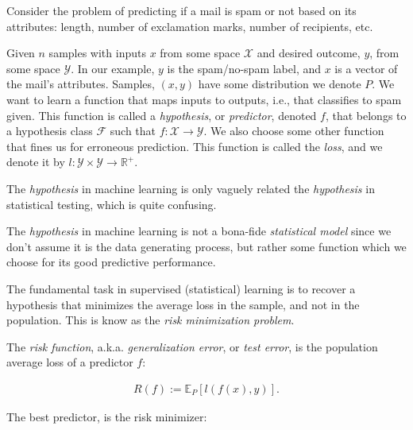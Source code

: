 \documentclass[]{book}
\theoremstyle{definition}
\theoremstyle{definition}
\theoremstyle{definition}
\theoremstyle{remark}
\let\BeginKnitrBlock\begin \let\EndKnitrBlock\end
\begin{document}
\BeginKnitrBlock{example}[Rental Prices]
\protect\hypertarget{exm:rental-prices}{}{\label{exm:rental-prices}
{} }Consider the problem of predicting if a
mail is spam or not based on its attributes: length, number of
exclamation marks, number of recipients, etc.
\EndKnitrBlock{example}

Given \(n\) samples with inputs \(x\) from some space \(\mathcal{X}\)
and desired outcome, \(y\), from some space \(\mathcal{Y}\). In our
example, \(y\) is the spam/no-spam label, and \(x\) is a vector of the
mail's attributes. Samples, \((x,y)\) have some distribution we denote
\(P\). We want to learn a function that maps inputs to outputs, i.e.,
that classifies to spam given. This function is called a
\emph{hypothesis}, or \emph{predictor}, denoted \(f\), that belongs to a
hypothesis class \(\mathcal{F}\) such that
\(f:\mathcal{X} \to \mathcal{Y}\). We also choose some other function
that fines us for erroneous prediction. This function is called the
\emph{loss}, and we denote it by
\(l:\mathcal{Y}\times \mathcal{Y} \to \mathbb{R}^+\).

\BeginKnitrBlock{remark}
{}The \emph{hypothesis} in machine learning is
only vaguely related the \emph{hypothesis} in statistical testing, which
is quite confusing.
\EndKnitrBlock{remark}

\BeginKnitrBlock{remark}
{}The \emph{hypothesis} in machine learning is
not a bona-fide \emph{statistical model} since we don't assume it is the
data generating process, but rather some function which we choose for
its good predictive performance.
\EndKnitrBlock{remark}

The fundamental task in supervised (statistical) learning is to recover
a hypothesis that minimizes the average loss in the sample, and not in
the population. This is know as the \emph{risk minimization problem}.

\BeginKnitrBlock{definition}[Risk Function]
\protect\hypertarget{def:unnamed-chunk-184}{}{\label{def:unnamed-chunk-184}
{} }The \emph{risk function}, a.k.a.
\emph{generalization error}, or \emph{test error}, is the population
average loss of a predictor \(f\):

\begin{align}
  R(f):=\mathbb{E}_P[l(f(x),y)].
\end{align}
\EndKnitrBlock{definition}

The best predictor, is the risk minimizer:
\end{document}

